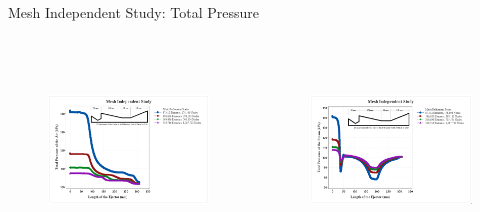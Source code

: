 \begin{frame}{Mesh Independent Study: Total Pressure}
       \begin{columns}
      \begin{figure}[h]
      \centering
      \includegraphics[height=4.5cm]{images/MISTPAir.png}
      \label{fig:meshindependentstudy}
      \end{figure}
      \begin{figure}[h]
      \centering
      \includegraphics[height=4.5cm]{images/MISTPsteam.png}
      \label{fig:meshindependentstudy}
      \end{figure}
    \end{columns}
\end{frame}

